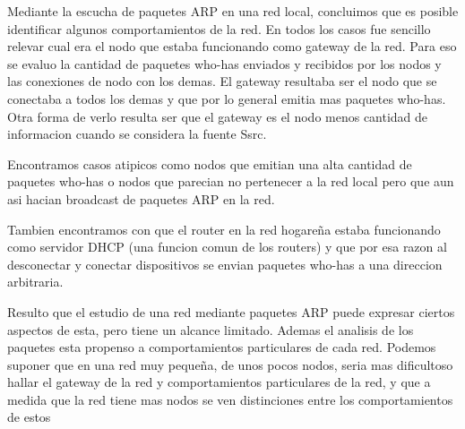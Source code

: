 Mediante la escucha de paquetes ARP en una red local, concluimos que es posible identificar algunos comportamientos de la red. En todos los casos fue sencillo relevar cual era el nodo que estaba funcionando como gateway de la red. Para eso se evaluo la cantidad de paquetes who-has enviados y recibidos por los nodos y las conexiones de nodo con los demas. El gateway resultaba ser el nodo que se conectaba a todos los demas y que por lo general emitia mas paquetes who-has. Otra forma de verlo resulta ser que el gateway es el nodo menos cantidad de informacion cuando se considera la fuente Ssrc.

Encontramos casos atipicos como nodos que emitian una alta cantidad de paquetes who-has o nodos que parecian no pertenecer a la red local pero que aun asi hacian broadcast de paquetes ARP en la red. 

Tambien encontramos con que el router en la red hogareña estaba funcionando como servidor DHCP (una funcion comun de los routers) y que por esa razon al desconectar y conectar dispositivos se envian paquetes who-has a una direccion arbitraria.

Resulto que el estudio de una red mediante paquetes ARP puede expresar ciertos aspectos de esta, pero tiene un alcance limitado. Ademas el analisis de los paquetes esta propenso a comportamientos particulares de cada red. Podemos suponer que en una red muy pequeña, de unos pocos nodos, seria mas dificultoso hallar el gateway de la red y comportamientos particulares de la red, y que a medida que la red tiene mas nodos se ven distinciones entre los comportamientos de estos
